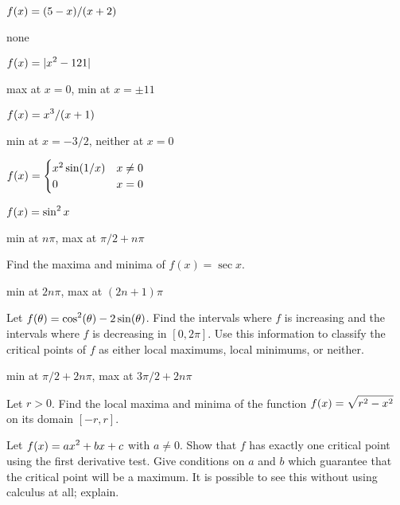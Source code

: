 \begin{exercises}
\begin{exercise}
$\displaystyle f(x) = (5-x)/(x+2)$
\begin{answer} none
\end{answer}\end{exercise}

\begin{exercise} $\displaystyle f(x) = |x^2 - 121|$
\begin{answer} max at $x=0$, min at $x=\pm 11$
\end{answer}\end{exercise}

\begin{exercise} $\displaystyle f(x) = x^3/(x+1)$
\begin{answer} min at $x=-3/2$, neither at $x=0$
\end{answer}\end{exercise}

\begin{exercise} $\displaystyle f(x)= \begin{cases}
x^2 \sin(1/x)  & x\neq 0  \\
 0  & x=0 \end{cases}$
\end{exercise}

\begin{exercise} $\displaystyle f(x) = \sin ^2 x$
\begin{answer} min at $n\pi$, max at $\pi/2+n\pi$
\end{answer}\end{exercise}

\endtwocol
\bsk
\begin{exercise} Find the maxima and minima of $f(x)=\sec x$.
\begin{answer} min at $2n\pi$, max at $(2n+1)\pi$
\end{answer}\end{exercise}

\begin{exercise}  Let $\displaystyle f(\theta) = \cos^2(\theta) -
 2\sin(\theta)$.  Find the intervals where $f$ is increasing and the
 intervals where $f$ is decreasing in $[0,2\pi]$.  Use this
 information to classify the critical points of $f$ as either local
 maximums, local minimums, or neither.
\begin{answer} min at $\pi/2+2n\pi$, max at $3\pi/2+2n\pi$
\end{answer}\end{exercise}

\begin{exercise} Let $r>0$. Find the local
maxima and minima of the function $\displaystyle f(x)
=\sqrt{r^2 -x^2 }$ on its domain $[-r,r]$.
\end{exercise}

\begin{exercise} Let $\displaystyle f(x) =a x^2 + bx + c$ with $a\neq 0$. Show that $f$
has exactly one critical point using the first derivative test. Give
conditions on $a$ and $b$ which guarantee that the critical point will
be a maximum. It is possible to see this without using calculus at
all; explain.
\end{exercise}

\end{exercises}
